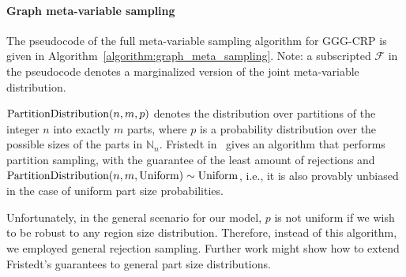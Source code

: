 \paragraph{Graph meta-variable sampling}

The pseudocode of the full meta-variable sampling algorithm for GGG-CRP is given in Algorithm~\ref{algorithm:graph_meta_sampling}. Note: a subscripted $\mathcal{F}$ in the pseudocode denotes a marginalized version of the joint meta-variable distribution.
\begin{algorithm}[H]
\caption{Graph meta-variable sampling}
\label{algorithm:graph_meta_sampling}
\begin{algorithmic}
\ENDFOR
{}
\end{algorithmic}
\end{algorithm} 

$\text{PartitionDistribution}\mathopen{}\left(n,m,p\right)$ denotes the distribution over partitions of the integer $n$ into exactly $m$ parts, where $p$ is a probability distribution over the possible sizes of the parts in $\mathbb{N}_{n}$. Fristedt in~\cite{fristedt_structure_1993} gives an algorithm that performs partition sampling, with the guarantee of the least amount of rejections and $\text{PartitionDistribution}\mathopen{}\left(n,m,\text{Uniform}\right) \sim \text{Uniform}$, i.e., it is also provably unbiased in the case of uniform part size probabilities. 

Unfortunately, in the general scenario for our model, $p$ is not uniform if we wish to be robust to any region size distribution. Therefore, instead of this algorithm, we employed general rejection sampling. Further work might show how to extend Fristedt's guarantees to general part size distributions.
    
